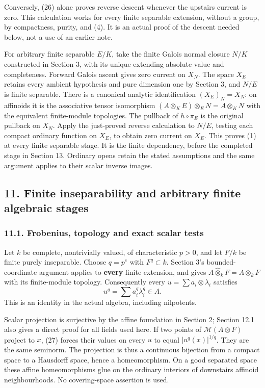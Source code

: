 \documentclass[
  11pt,
]{article}
\begin{document}
Conversely, (26) alone proves reverse descent whenever the upstairs
current is zero. This calculation works for every finite separable
extension, without a group, by compactness, purity, and (4). It is an
actual proof of the descent needed below, not a use of an earlier note.

For arbitrary finite separable \(E/K\), take the finite Galois normal
closure \(N/K\) constructed in Section 3, with its unique extending
absolute value and completeness. Forward Galois ascent gives zero
current on \(X_N\). The space \(X_E\) retains every ambient hypothesis
and pure dimension one by Section 3, and \(N/E\) is finite separable.
There is a canonical analytic identification \((X_E)_N=X_N\): on
affinoids it is the associative tensor isomorphism
\((A\otimes_K E)\otimes_E N=A\otimes_K N\) with the equivalent
finite-module topologies. The pullback of \(h\circ\pi_E\) is the
original pullback on \(X_N\). Apply the just-proved reverse calculation
to \(N/E\), testing each compact ordinary function on \(X_E\), to obtain
zero current on \(X_E\). This proves (1) at every finite separable
stage. It is the finite dependency, before the completed stage in
Section 13. Ordinary opens retain the stated assumptions and the same
argument applies to their scalar inverse images.

\subsection{11. Finite inseparability and arbitrary finite algebraic
stages}\label{finite-inseparability-and-arbitrary-finite-algebraic-stages}

\subsubsection{11.1. Frobenius, topology and exact scalar
tests}\label{frobenius-topology-and-exact-scalar-tests}

Let \(k\) be complete, nontrivially valued, of characteristic \(p>0\),
and let \(F/k\) be finite purely inseparable. Choose \(q=p^e\) with
\(F^q\subset k\). Section 3's bounded-coordinate argument applies to
\textbf{every} finite extension, and gives
\(A\widehat\otimes_k F=A\otimes_k F\) with its finite-module topology.
Consequently every \(u=\sum a_i\otimes\lambda_i\) satisfies \[
                    u^q=\sum a_i^q\lambda_i^q\in A.       \tag{27}
\] This is an identity in the actual algebra, including nilpotents.

Scalar projection is surjective by the affine foundation in Section 2;
Section 12.1 also gives a direct proof for all fields used here. If two
points of \(\mathcal M(A\otimes F)\) project to \(x\), (27) forces their
values on every \(u\) to equal \(|u^q(x)|^{1/q}\). They are the same
seminorm. The projection is thus a continuous bijection from a compact
space to a Hausdorff space, hence a homeomorphism. On a good separated
space these affine homeomorphisms glue on the ordinary interiors of
downstairs affinoid neighbourhoods. No covering-space assertion is used.
\end{document}
